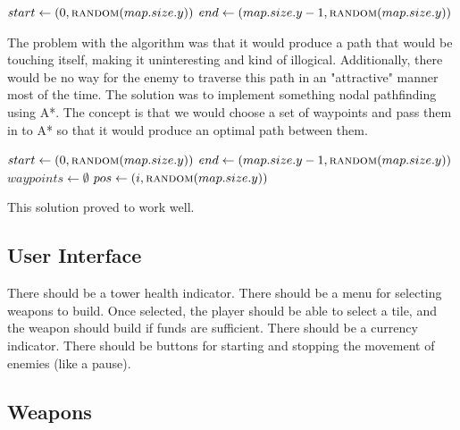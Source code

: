 \documentclass{article}
\begin{document}
\vspace{5mm}

\begin{algorithmic}
    \State $start \gets (0, \Call{random}{map.size.y})$
    \State $end \gets (map.size.y - 1, \Call{random}{map.size.y})$
    \State {}
    \EndProcedure
\end{algorithmic}

The problem with the algorithm was that it would produce a path that would be touching itself, making it uninteresting and kind of illogical. Additionally, there would be no way for the enemy to traverse this path in an "attractive" manner most of the time. The solution was to implement something nodal pathfinding using A*. The concept is that we would choose a set of waypoints and pass them in to A* so that it would produce an optimal path between them.

\vspace{5mm}

\begin{algorithmic}
    \State $start \gets (0, \Call{random}{map.size.y})$
    \State $end \gets (map.size.y - 1, \Call{random}{map.size.y})$
    \State $waypoints \gets \emptyset$
    \State {}
    \State $pos \gets (i, \Call{random}{map.size.y})$
    \State {}
    \EndFor
    \State {}
    \State {}
    \EndFor
    \EndProcedure
\end{algorithmic}

This solution proved to work well.

\subsection{User Interface}

There should be a tower health indicator. There should be a menu for selecting weapons to build. Once selected, the player should be able to select a tile, and the weapon should build if funds are sufficient. There should be a currency indicator. There should be buttons for starting and stopping the movement of enemies (like a pause).

\subsection{Weapons}
\end{document}
